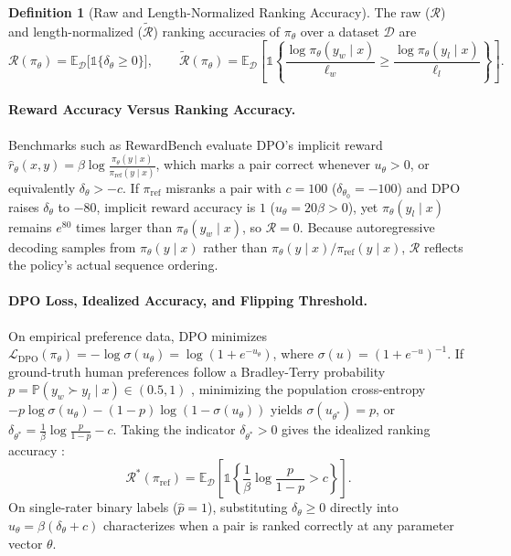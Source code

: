 \documentclass[11pt]{article}
\theoremstyle{plain}
\theoremstyle{definition}
\newtheorem{definition}[theorem]{Definition}
\newcommand{\piref}{\pi_{\mathrm{ref}}}
\newcommand{\pitheta}{\pi_{\theta}}
\newcommand{\LDPO}{\mathcal{L}_{\mathrm{DPO}}}
\newcommand{\Racc}{\mathcal{R}}
\newcommand{\Racctilde}{\widetilde{\mathcal{R}}}
\newcommand{\Ind}{\mathds{1}}
\newcommand{\E}{\mathbb{E}}
\begin{document}
\begin{definition}[Raw and Length-Normalized Ranking Accuracy]
\label{def:rank_acc}
The raw ($\Racc$) and length-normalized ($\Racctilde$) ranking accuracies of $\pitheta$ over a dataset $\mathcal{D}$ are
\begin{equation}
  \Racc(\pitheta) = \E_{\mathcal{D}}\big[\Ind\{\delta_\theta \ge 0\}\big],
  \qquad
  \Racctilde(\pitheta) = \E_{\mathcal{D}}\!\left[\Ind\!\left\{\frac{\log \pitheta(y_w \mid x)}{\ell_w} \ge \frac{\log \pitheta(y_l \mid x)}{\ell_l}\right\}\right].
  \label{eq:ranking_acc}
\end{equation}
\end{definition}

\paragraph{Reward Accuracy Versus Ranking Accuracy.}
Benchmarks such as RewardBench evaluate DPO's implicit reward $\hat{r}_\theta(x, y) = \beta \log \frac{\pitheta(y \mid x)}{\piref(y \mid x)}$, which marks a pair correct whenever $u_\theta > 0$, or equivalently $\delta_\theta > -c$. If $\piref$ misranks a pair with $c = 100$ ($\delta_{\theta_0} = -100$) and DPO raises $\delta_\theta$ to $-80$, implicit reward accuracy is $1$ ($u_\theta = 20\beta > 0$), yet $\pitheta(y_l \mid x)$ remains $e^{80}$ times larger than $\pitheta(y_w \mid x)$, so $\Racc = 0$. Because autoregressive decoding samples from $\pitheta(y \mid x)$ rather than $\pitheta(y \mid x)/\piref(y \mid x)$, $\Racc$ reflects the policy's actual sequence ordering.

\paragraph{DPO Loss, Idealized Accuracy, and Flipping Threshold.}
On empirical preference data, DPO minimizes $\LDPO(\pitheta) = -\log \sigma(u_\theta) = \log(1 + e^{-u_\theta})$, where $\sigma(u) = (1 + e^{-u})^{-1}$. If ground-truth human preferences follow a Bradley-Terry probability $p = \mathbb{P}(y_w \succ y_l \mid x) \in (0.5, 1)$ \citep{bradley1952rank}, minimizing the population cross-entropy $-p \log \sigma(u_\theta) - (1 - p)\log(1 - \sigma(u_\theta))$ yields $\sigma(u_{\theta^*}) = p$, or $\delta_{\theta^*} = \frac{1}{\beta}\log\frac{p}{1-p} - c$. Taking the indicator $\delta_{\theta^*} > 0$ gives the idealized ranking accuracy \citep[Theorem~3.1 and Corollary~3.3,][]{chen2024preference}:
\begin{equation}
  \Racc^*(\piref) = \E_{\mathcal{D}}\!\left[\Ind\!\left\{\frac{1}{\beta}\log\frac{p}{1 - p} > c\right\}\right].
  \label{eq:idealized_acc}
\end{equation}
On single-rater binary labels ($\hat{p} = 1$), substituting $\delta_\theta \ge 0$ directly into $u_\theta = \beta(\delta_\theta + c)$ characterizes when a pair is ranked correctly at any parameter vector $\theta$.
\end{document}
